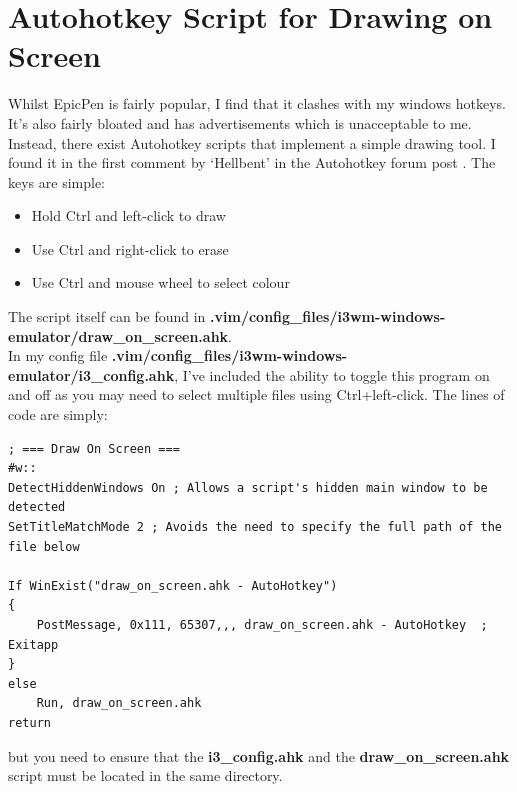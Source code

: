 \section{Autohotkey Script for Drawing on Screen}
Whilst EpicPen is fairly popular, I find that it clashes with my windows
hotkeys. It's also fairly bloated and has advertisements which is unacceptable
to me. Instead, there exist Autohotkey scripts that implement a simple drawing
tool. I found it in the first comment by `Hellbent' in the Autohotkey forum post
\cite{hellbent2019draw}. The keys are simple:
\begin{itemize}
    \item Hold Ctrl and left-click to draw
    \item Use Ctrl and right-click to erase
    \item Use Ctrl and mouse wheel to select colour
\end{itemize}
The script itself can be found in
\textbf{.vim/config\_files/i3wm-windows-emulator/draw\_on\_screen.ahk}.\\

In my config file
\textbf{.vim/config\_files/i3wm-windows-emulator/i3\_config.ahk}, I've included
the ability to toggle this program on and off as you may need to select multiple
files using Ctrl+left-click. The lines of code are simply:
\begin{lstlisting}
; === Draw On Screen ===
#w::
DetectHiddenWindows On ; Allows a script's hidden main window to be detected
SetTitleMatchMode 2 ; Avoids the need to specify the full path of the file below

If WinExist("draw_on_screen.ahk - AutoHotkey")
{
	PostMessage, 0x111, 65307,,, draw_on_screen.ahk - AutoHotkey  ; Exitapp
}
else
	Run, draw_on_screen.ahk
return
\end{lstlisting}
but you need to ensure that the \textbf{i3\_config.ahk} and the
\textbf{draw\_on\_screen.ahk} script must be located in the same directory.
